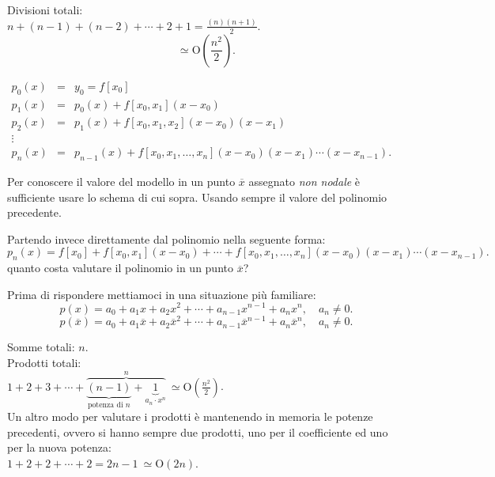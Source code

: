 Divisioni totali:\\
$n+(n-1)+(n-2)+ \cdots + 2 + 1 =  \frac{(n)(n+1)}{2}$.\\

\[\simeq \textrm{O}\left(\frac{n^2}{2}\right).\]

$\begin{array}{lcl}
p_0(x) & = & y_0 = f[x_0] \\
p_1(x) & = & p_0(x) + f[x_0,x_1](x-x_0) \\
p_2(x) & = & p_1(x) + f[x_0,x_1,x_2](x-x_0)(x-x_1) \\
\vdots \\
p_n(x) & = & p_{n-1}(x) + f[x_0,x_1,\ldots,x_n](x-x_0)(x-x_1)\cdots(x-x_{n-1}).
\end{array}$

\begin{flushleft}
Per conoscere il valore del modello in un punto $\overline{x}$ assegnato
\emph{non nodale} è sufficiente usare lo schema di cui sopra. Usando sempre
il valore del polinomio precedente.
\end{flushleft}
Partendo invece direttamente dal polinomio nella seguente forma:
\[
p_n(x) = f[x_0] +  f[x_0,x_1](x-x_0)  +
         \cdots + f[x_0,x_1,\ldots,x_n](x-x_0)(x-x_1)\cdots(x-x_{n-1}).
\]
quanto costa valutare il polinomio in un punto $\overline{x}$?

Prima di rispondere mettiamoci in una situazione più familiare:
\[
p(x) = a_0 + a_1x + a_2x^2+ \cdots + a_{n-1}x^{n-1} + a_nx^n, \quad a_n \neq 0.
\]
\[
p(\overline{x}) = a_0 + a_1\overline{x} + a_2\overline{x}^2+ \cdots +
a_{n-1}\overline{x}^{n-1} + a_n\overline{x}^n, \quad a_n \neq 0.
\]

Somme totali: $n$.\\

Prodotti totali:\\
$1 + 2 + 3 + \cdots + \overbrace{\underbrace{(n-1)}_{\textrm{potenza di } n}
+ \underbrace{1}_{a_n\cdot x^n}}^{n}
\ \simeq  \textrm{O}\left(
\frac{n^2}{2}\right)$.\\

Un altro modo per valutare i prodotti è mantenendo in memoria le potenze
precedenti, ovvero si hanno sempre due prodotti, uno per il coefficiente ed
uno per la nuova potenza:\\
$1 + 2 + 2 + \cdots + 2 = 2n-1 \ \simeq \textrm{O}\left(2n\right)$.

